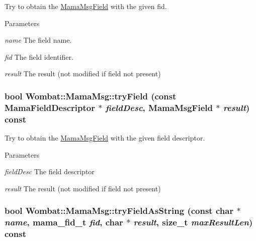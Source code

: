 Try to obtain the \hyperlink{classWombat_1_1MamaMsgField}{MamaMsgField} with the given fid. 
\begin{DoxyParams}{Parameters}
\item[{\em name}]The field name. \item[{\em fid}]The field identifier. \item[{\em result}]The result (not modified if field not present) \end{DoxyParams}
\hypertarget{classWombat_1_1MamaMsg_a52324667b6a7da49b31bb0c490fd9535}{
\subsubsection[{tryField}]{\setlength{\rightskip}{0pt plus 5cm}bool Wombat::MamaMsg::tryField (const {\bf MamaFieldDescriptor} $\ast$ {\em fieldDesc}, \/  {\bf MamaMsgField} $\ast$ {\em result}) const}}
\label{classWombat_1_1MamaMsg_a52324667b6a7da49b31bb0c490fd9535}


Try to obtain the \hyperlink{classWombat_1_1MamaMsgField}{MamaMsgField} with the given field descriptor. 
\begin{DoxyParams}{Parameters}
\item[{\em fieldDesc}]The field descriptor \item[{\em result}]The result (not modified if field not present) \end{DoxyParams}
\hypertarget{classWombat_1_1MamaMsg_a7df22f1047cf64ebeb464face478bda5}{
\subsubsection[{tryFieldAsString}]{\setlength{\rightskip}{0pt plus 5cm}bool Wombat::MamaMsg::tryFieldAsString (const char $\ast$ {\em name}, \/  mama\_\-fid\_\-t {\em fid}, \/  char $\ast$ {\em result}, \/  size\_\-t {\em maxResultLen}) const}}
\label{classWombat_1_1MamaMsg_a7df22f1047cf64ebeb464face478bda5}


